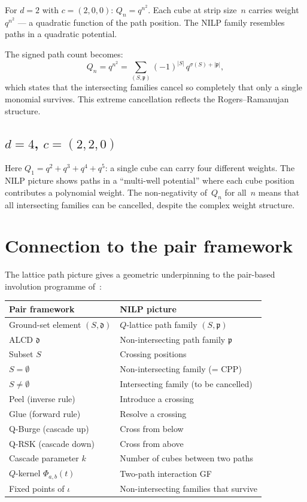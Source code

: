 \documentclass[11pt]{article}
\theoremstyle{plain}
\theoremstyle{definition}
\begin{document}
For $d = 2$ with $c = (2,0,0)$: $Q_n = q^{n^2}$.  Each
cube at strip size~$n$ carries weight $q^{n^2}$ --- a
quadratic function of the path position.  The NILP family
resembles paths in a quadratic potential.

The signed path count becomes:
\[
  Q_n = q^{n^2} = \sum_{(S, \mathfrak{p})}
    (-1)^{|S|}\, q^{\sigma(S) + |\mathfrak{p}|},
\]
which states that the intersecting families cancel so
completely that only a single monomial survives.  This
extreme cancellation reflects the Rogers--Ramanujan
structure.


\subsection{$d = 4$, $c = (2,2,0)$}

Here $Q_1 = q^2 + q^3 + q^4 + q^5$: a single cube can
carry four different weights.  The NILP picture shows
paths in a ``multi-well potential'' where each cube
position contributes a polynomial weight.  The
non-negativity of~$Q_n$ for all~$n$ means that all
intersecting families can be cancelled, despite the
complex weight structure.


\section{Connection to the pair framework}
\label{sec:connection}

The lattice path picture gives a geometric underpinning to
the pair-based involution programme of~\cite{LOCAL_RULE}:

\begin{center}
\begin{tabular}{l|l}
\textbf{Pair framework} &
  \textbf{NILP picture} \\ \hline
Ground-set element $(S, \mathfrak{d})$ &
  $Q$-lattice path family $(S, \mathfrak{p})$ \\
ALCD $\mathfrak{d}$ &
  Non-intersecting path family $\mathfrak{p}$ \\
Subset $S$ &
  Crossing positions \\
$S = \emptyset$ &
  Non-intersecting family (= CPP) \\
$S \neq \emptyset$ &
  Intersecting family (to be cancelled) \\
Peel (inverse rule) &
  Introduce a crossing \\
Glue (forward rule) &
  Resolve a crossing \\
Q-Burge (cascade up) &
  Cross from below \\
Q-RSK (cascade down) &
  Cross from above \\
Cascade parameter $k$ &
  Number of cubes between two paths \\
$Q$-kernel $\Phi_{a,b}(t)$ &
  Two-path interaction GF \\
Fixed points of $\iota$ &
  Non-intersecting families that survive
\end{tabular}
\end{center}
\end{document}
